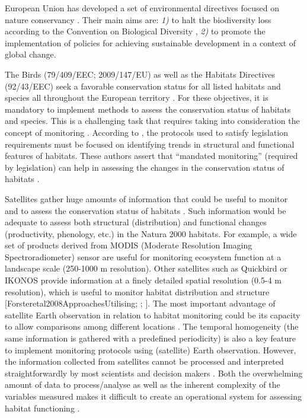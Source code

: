 European Union has developed a set of environmental directives focused on nature conservancy \autocite{Evans2012BuildingEuropean}. Their main aims are: \emph{1)} to halt the biodiversity loss according to the Convention on Biological Diversity \autocite{CBDSecretariatdelaConventiononBiologicalDiversity2003HandbookConvention}, \emph{2)} to promote the implementation of policies for achieving sustainable development in a context of global change.

The Birds (79/409/EEC; 2009/147/EU) as well as the Habitats Directives (92/43/EEC) seek a favorable conservation status for all listed habitats and species all throughout the European territory \autocite{Louetteetal2011BridgingGap}. For these objectives, it is mandatory to implement methods to assess the conservation status of habitats and species. This is a challenging task that requires taking into consideration the concept of monitoring \autocite{LindenmayerLikens2010ScienceApplication,PereiraCooper2006GlobalMonitoring}. According to \textcite{LindenmayerLikens2010ScienceApplication}, the protocols used to satisfy legislation requirements must be focused on identifying trends in structural and functional features of habitats. These authors assert that ``mandated monitoring'' (required by legislation) can help in assessing the changes in the conservation status of habitats \autocite{LindenmayerLikens2010ScienceApplication}.

Satellites gather huge amounts of information that could be useful to monitor and to assess the conservation status of habitats \autocite{VandenBorreetal2011IntegratingRemote}. Such information would be adequate to assess both structural (distribution) and functional changes (productivity, phenology, etc.) in the Natura 2000 habitats. For example, a wide set of products derived from MODIS (Moderate Resolution Imaging Spectroradiometer) sensor are useful for monitoring ecosystem function at a landscape scale (250-1000 m resolution)\autocite{Halletal2002MODISSnowcover,Hueteetal2002OverviewRadiometric,Justiceetal2002OverviewMODIS}. Other satellites such as Quickbird or IKONOS provide information at a finely detailed spatial resolution (0.5-4 m resolution), which is useful to monitor habitat distribution and structure {[}Forsteretal2008ApproachesUtilising; \textcite{Hydeetal2006MappingForest}; \textcite{Wangetal2004ComparisonIKONOS}{]}. The most important advantage of satellite Earth observation in relation to habitat monitoring could be its capacity to allow comparisons among different locations \autocite{VandenBorreetal2011IntegratingRemote}. The temporal homogeneity (the same information is gathered with a predefined periodicity) is also a key feature to implement monitoring protocols using (satellite) Earth observation. However, the information collected from satellites cannot be processed and interpreted straightforwardly by most scientists and decision makers \autocite{Kallurietal2003PotentialRemote}. Both the overwhelming amount of data to process/analyse as well as the inherent complexity of the variables measured makes it difficult to create an operational system for assessing habitat functioning \autocite{Xueetal2011HighThroughput}.

